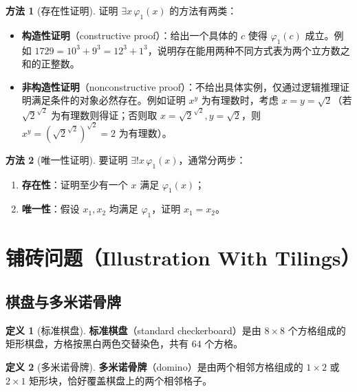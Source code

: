 \documentclass[UTF8,11pt,a4paper]{ctexbook}   %
\theoremstyle{definition}
\newtheorem{definition}{定义}[section]
\newtheorem{method}{方法}[section]
\begin{document}
\begin{method}[存在性证明]
证明 $\exists x\,\varphi_1(x)$ 的方法有两类：
\begin{itemize}
    \item \textbf{构造性证明}（constructive proof）：给出一个具体的 $c$ 使得 $\varphi_1(c)$ 成立。例如 $1729 = 10^3+9^3 = 12^3+1^3$，说明存在能用两种不同方式表为两个立方数之和的正整数。
    \item \textbf{非构造性证明}（nonconstructive proof）：不给出具体实例，仅通过逻辑推理证明满足条件的对象必然存在。例如证明 $x^y$ 为有理数时，考虑 $x=y=\sqrt{2}$（若 $\sqrt{2}^{\sqrt{2}}$ 为有理数则得证；否则取 $x=\sqrt{2}^{\sqrt{2}}, y=\sqrt{2}$，则 $x^y=(\sqrt{2}^{\sqrt{2}})^{\sqrt{2}}=2$ 为有理数）。
\end{itemize}
\end{method}

\begin{method}[唯一性证明]
要证明 $\exists!x\,\varphi_1(x)$，通常分两步：
\begin{enumerate}
    \item \textbf{存在性}：证明至少有一个 $x$ 满足 $\varphi_1(x)$；
    \item \textbf{唯一性}：假设 $x_1,x_2$ 均满足 $\varphi_1$，证明 $x_1=x_2$。
\end{enumerate}
\end{method}

\section{铺砖问题（Illustration With Tilings）}

\subsection{棋盘与多米诺骨牌}

\begin{definition}[标准棋盘]
\textbf{标准棋盘}（standard checkerboard）是由 $8\times 8$ 个方格组成的矩形棋盘，方格按黑白两色交替染色，共有 $64$ 个方格。
\end{definition}

\begin{definition}[多米诺骨牌]
\textbf{多米诺骨牌}（domino）是由两个相邻方格组成的 $1\times 2$ 或 $2\times 1$ 矩形块，恰好覆盖棋盘上的两个相邻格子。
\end{definition}
\end{document}
